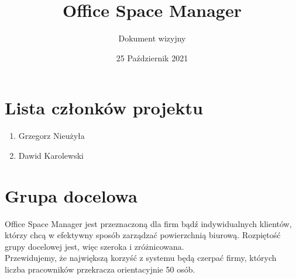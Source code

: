 \documentclass{article}
\title{Office Space Manager}
\author{Dokument wizyjny}
\date{25 Październik 2021}
\begin{document}
\maketitle

\section{Lista członków projektu}
\begin{enumerate}
  \item Grzegorz Nieużyła
  \item Dawid Karolewski
\end{enumerate}


\section{Grupa docelowa}
\hspace{10mm} Office Space Manager jest przeznaczoną dla firm bądź indywidualnych klientów, którzy chcą w efektywny sposób zarządzać powierzchnią biurową. Rozpiętość grupy docelowej jest, więc szeroka i zróżnicowana.\\
\hspace*{10mm} Przewidujemy, że największą korzyść z systemu będą czerpać firmy, których liczba pracowników przekracza orientacyjnie 50 osób.
\end{document}
